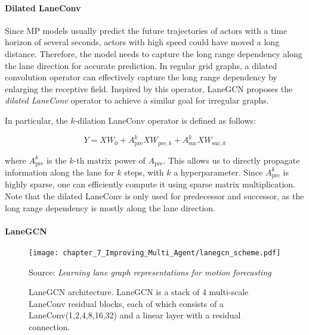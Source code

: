 \paragraph{Dilated LaneConv}
\label{par:7_improving_efficiency_dilated_laneconv}

Since \ac{MP} models usually predict the future trajectories of actors with a time horizon of several seconds, actors with high speed could have moved a long distance. Therefore, the model needs to capture the long range dependency along the lane direction for accurate prediction. In regular grid graphs, a dilated convolution operator \cite{yu2015multi} can effectively capture the long range dependency by enlarging the receptive field. Inspired by this operator, LaneGCN \cite{liang2020learning} proposes the \textit{dilated LaneConv} operator to achieve a similar goal for irregular graphs. 

In particular, the $k$-dilation LaneConv operator is defined as follows:

\begin{equation}
	Y = XW_0 + A_{\text{pre}}^k X W_{\text{pre},k} + A_{\text{suc}}^k X W_{\text{suc},k}
	\label{eqn:dilated_laneconv}
\end{equation}

where $A_{\text{pre}}^k$ is the $k$-th matrix power of $A_{\text{pre}}$. 
This  allows us to directly propagate information along the lane for $k$ steps, with $k$ a hyperparameter. Since $A_{\text{pre}}^k$ is highly sparse, one can efficiently compute it using sparse matrix multiplication. Note that the dilated LaneConv is only used for predecessor and successor, as the long range dependency is mostly along the lane direction.

\paragraph{LaneGCN}
\label{par:7_improving_efficiency_lanegcn}

\begin{figure}[t]                               
	\begin{center}
		\texttt{[image: chapter\_7\_Improving\_Multi\_Agent/lanegcn\_scheme.pdf]}
	\end{center}
	\captionsetup{justification=justified}
	\caption[LaneGCN architecture]{LaneGCN architecture. LaneGCN is a stack of 4 multi-scale LaneConv residual blocks, each of which consists of a LaneConv(1,2,4,8,16,32) and a linear layer with a residual connection.}
	Source: \textit{Learning lane graph representations for motion forecasting} \cite{liang2020learning}
	\label{fig:chapter_7_Improving_Multi_Agent/improving_efficiency_lanegcn}
\end{figure}

